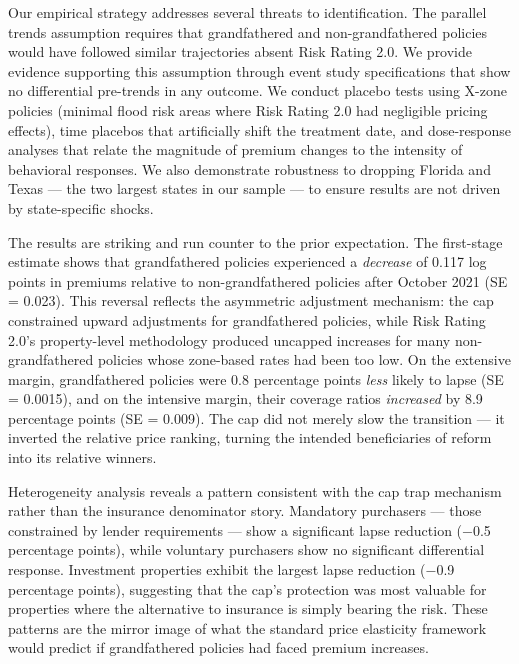 \documentclass[12pt]{article}
\begin{document}
Our empirical strategy addresses several threats to identification. The parallel trends assumption requires that grandfathered and non-grandfathered policies would have followed similar trajectories absent Risk Rating 2.0. We provide evidence supporting this assumption through event study specifications that show no differential pre-trends in any outcome. We conduct placebo tests using X-zone policies (minimal flood risk areas where Risk Rating 2.0 had negligible pricing effects), time placebos that artificially shift the treatment date, and dose-response analyses that relate the magnitude of premium changes to the intensity of behavioral responses. We also demonstrate robustness to dropping Florida and Texas --- the two largest states in our sample --- to ensure results are not driven by state-specific shocks.

The results are striking and run counter to the prior expectation. The first-stage estimate shows that grandfathered policies experienced a \textit{decrease} of 0.117 log points in premiums relative to non-grandfathered policies after October 2021 (SE = 0.023). This reversal reflects the asymmetric adjustment mechanism: the cap constrained upward adjustments for grandfathered policies, while Risk Rating 2.0's property-level methodology produced uncapped increases for many non-grandfathered policies whose zone-based rates had been too low. On the extensive margin, grandfathered policies were 0.8 percentage points \textit{less} likely to lapse (SE = 0.0015), and on the intensive margin, their coverage ratios \textit{increased} by 8.9 percentage points (SE = 0.009). The cap did not merely slow the transition --- it inverted the relative price ranking, turning the intended beneficiaries of reform into its relative winners.

Heterogeneity analysis reveals a pattern consistent with the cap trap mechanism rather than the insurance denominator story. Mandatory purchasers --- those constrained by lender requirements --- show a significant lapse reduction ($-$0.5 percentage points), while voluntary purchasers show no significant differential response. Investment properties exhibit the largest lapse reduction ($-$0.9 percentage points), suggesting that the cap's protection was most valuable for properties where the alternative to insurance is simply bearing the risk. These patterns are the mirror image of what the standard price elasticity framework would predict if grandfathered policies had faced premium increases.
\end{document}
